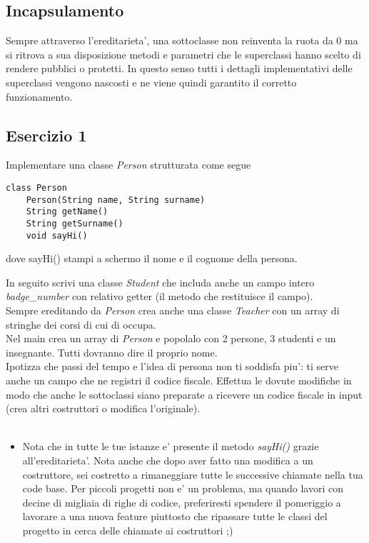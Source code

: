\documentclass{article}
\begin{document}
\newpage

\subsection*{Incapsulamento}
Sempre attraverso l'ereditarieta', una sottoclasse non reinventa la ruota da 0
ma si ritrova a sua disposizione metodi e parametri che le superclassi hanno
scelto di rendere pubblici o protetti. In questo senso tutti i dettagli
implementativi delle superclassi vengono nascosti e ne viene quindi garantito il
corretto funzionamento. 
\subsection*{Esercizio 1}
Implementare una classe \textit{Person} strutturata come segue
\begin{verbatim}
class Person
    Person(String name, String surname)
    String getName()
    String getSurname()
    void sayHi()
\end{verbatim}
dove sayHi() stampi a schermo il nome e il cognome della persona.
 
In seguito scrivi una classe \textit{Student} che includa anche un campo intero
\textit{badge\_number} con relativo getter (il metodo che restituisce il
campo).\\
Sempre ereditando da \textit{Person} crea anche una classe \textit{Teacher} con
un array di stringhe dei corsi di cui di occupa. \\
Nel main crea un array di \textit{Person} e popolalo con 2 persone, 3 studenti e
un insegnante. Tutti dovranno dire il proprio nome. \\
Ipotizza che passi del tempo e l'idea di persona non ti soddisfa piu': ti serve
anche un campo che ne registri il codice fiscale. Effettua le dovute modifiche
in modo che anche le sottoclassi siano preparate a ricevere un codice fiscale in
input (crea altri costruttori o modifica l'originale). \\ \\
\begin{itemize}
    \item Nota che in tutte le tue istanze e' presente il metodo \textit{sayHi()} grazie
all'ereditarieta'. Nota anche che dopo aver fatto una modifica a un costruttore,
sei costretto a rimaneggiare tutte le successive chiamate nella tua code base.
Per piccoli progetti non e' un problema, ma quando lavori con decine di migliaia
di righe di codice, preferiresti spendere il pomeriggio a lavorare a una nuova
feature piuttosto che ripassare tutte le classi del progetto in cerca delle
chiamate ai costruttori ;)
\end{itemize}
\end{document}

